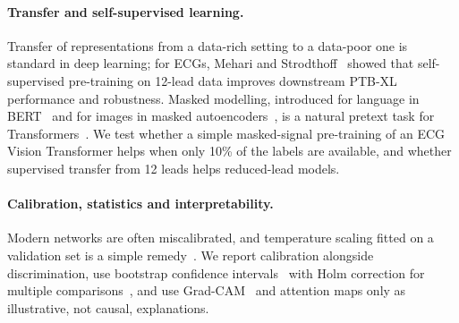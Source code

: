 \paragraph{Transfer and self-supervised learning.} Transfer of representations from a data-rich setting to a data-poor one is standard in deep learning; for ECGs, Mehari and Strodthoff~\cite{mehari2022ssl} showed that self-supervised pre-training on 12-lead data improves downstream PTB-XL performance and robustness. Masked modelling, introduced for language in BERT~\cite{devlin2019bert} and for images in masked autoencoders~\cite{he2022mae}, is a natural pretext task for Transformers~\cite{vaswani2017attention,dosovitskiy2021vit}. We test whether a simple masked-signal pre-training of an ECG Vision Transformer helps when only 10\% of the labels are available, and whether supervised transfer from 12 leads helps reduced-lead models.

\paragraph{Calibration, statistics and interpretability.} Modern networks are often miscalibrated, and temperature scaling fitted on a validation set is a simple remedy~\cite{guo2017calibration}. We report calibration alongside discrimination, use bootstrap confidence intervals~\cite{efron1993bootstrap} with Holm correction for multiple comparisons~\cite{holm1979}, and use Grad-CAM~\cite{selvaraju2017gradcam} and attention maps only as illustrative, not causal, explanations.
